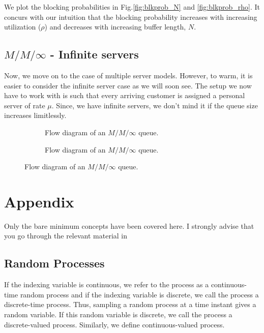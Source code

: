 \documentclass[11pt, a4paper]{report}
\begin{document}
We plot the blocking probabilities in Fig.\ref{fig:blkprob_N} and \ref{fig:blkprob_rho}. It concurs with our intuition that the blocking probability increases with increasing utilization ($\rho$) and decreases with increasing buffer length, $N$.

\section{$M/M/\infty$ - Infinite servers}

Now, we move on to the case of multiple server models. However, to warm, it is easier to consider the infinite server case as we will soon see. The setup we now have to work with is such that every arriving customer is assigned a personal server of rate $\mu$. Since, we have infinite servers, we don't mind it if the queue size increases limitlessly. 

\begin{figure}[ht]
    
    \begin{subfigure}[b]{0.55\textwidth}
        \centering
        
        \caption{Flow diagram of an $M/M/\infty$ queue.}
        \label{fig:blk_mminfinite}
    \end{subfigure}
    \hfill
    \begin{subfigure}[b]{0.55\textwidth}
        \centering
        
        \caption{Flow diagram of an $M/M/\infty$ queue.}
        \label{fig:std_mminfinite}
    \end{subfigure}
    \label{fig:mminfinite_dig}
\end{figure}
\chapter{Appendix}
Only the bare minimum concepts have been covered here. I strongly advise that you go through the relevant material in \cite{pishro2014introduction}
\section{Random Processes}
If the indexing variable is continuous, we refer to the process as a continuous-time random process and if the indexing variable is discrete, we call the process a discrete-time process. Thus, sampling a random process at a time instant gives a random variable. If this random variable is discrete, we call the process a discrete-valued process. Similarly, we define continuous-valued process. 



\end{document}
